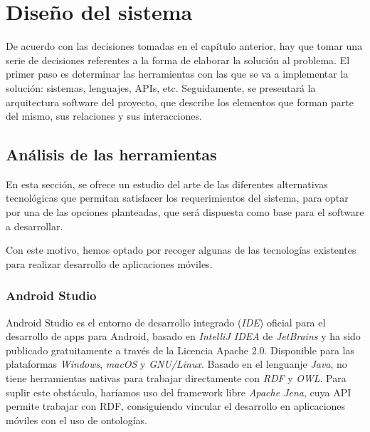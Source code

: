 


\chapter{Diseño del sistema}
De acuerdo con las decisiones tomadas en el capítulo anterior, hay que tomar una serie de decisiones 
referentes a la forma de elaborar la solución al problema. El primer paso es determinar las herramientas 
con las que se va a implementar la solución: sistemas, lenguajes, APIs, etc. Seguidamente, se presentará 
la arquitectura software del proyecto, que describe los elementos que forman parte del mismo, sus relaciones y
sus interacciones.

\section{Análisis de las herramientas}
En esta sección, se ofrece un estudio del arte de las diferentes alternativas tecnológicas que permitan satisfacer 
los requerimientos del sistema, para optar por una de las opciones planteadas, que será dispuesta como base 
para el software a desarrollar.\medskip

Con este motivo, hemos optado por recoger algunas de las tecnologías existentes para realizar desarrollo de aplicaciones 
móviles.

\subsection{Android Studio}
Android Studio es el entorno de desarrollo integrado (\textit{IDE}) oficial para el desarrollo de apps para Android, 
basado en \textit{IntelliJ IDEA} de \textit{JetBrains} y ha sido publicado gratuitamente a través de la Licencia Apache 2.0.
Disponible para las plataformas \textit{Windows}, \textit{macOS} y \textit{GNU/Linux}. Basado en el lenguanje \textit{Java},
no tiene herramientas nativas para trabajar directamente con \textit{RDF} y \textit{OWL}. Para suplir este obstáculo, 
haríamos uso del framework libre \textit{Apache Jena}, cuya API permite trabajar con RDF, consiguiendo vincular 
el desarrollo en aplicaciones móviles con el uso de ontologías.

